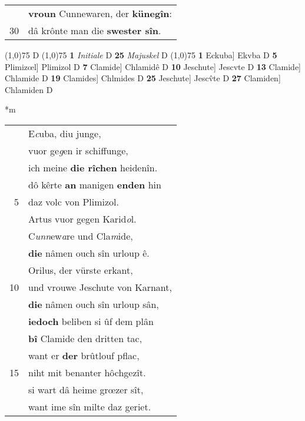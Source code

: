 \documentclass[8pt,a4paper,notitlepage]{article}
\begin{document}
\begin{table}[ht]
\begin{minipage}[t]{0.5\linewidth}
\begin{tabular}{rl}
 & \textbf{vroun} Cunnewaren, der \textbf{künegîn}:\\ 
30 & dâ krônte man die \textbf{swester sîn}.\\ 
\end{tabular}
\scriptsize
\line(1,0){75} \newline
D \newline
\line(1,0){75} \newline
\textbf{1} \textit{Initiale} D  \textbf{25} \textit{Majuskel} D  \newline
\line(1,0){75} \newline
\textbf{1} Eckuba] Ekvba D \textbf{5} Plimizœl] Plimizol D \textbf{7} Clamide] Chlamidê D \textbf{10} Jeschute] Jescvte D \textbf{13} Clamide] Chlamide D \textbf{19} Clamides] Chlmides D \textbf{25} Jeschute] Jescv̂te D \textbf{27} Clamiden] Chlamiden D \newline
\end{minipage}
\hspace{0.5cm}
\begin{minipage}[t]{0.5\linewidth}
\small
\begin{center}*m
\end{center}
\begin{tabular}{rl}
 & E\textit{c}uba, diu junge,\\ 
 & vuor ge\textit{g}en ir schiffunge,\\ 
 & ich meine \textbf{die rîchen} heidenîn.\\ 
 & dô kêrte \textbf{an} manigen \textbf{enden} hin\\ 
5 & daz volc von Plimizol.\\ 
 & Artus vuor gegen Karid\textit{o}l.\\ 
 & C\textit{unn}ew\textit{a}re und Cla\textit{m}ide,\\ 
 & \textbf{die} nâmen ouch sîn urloup ê.\\ 
 & Orilus, der vürste erkant,\\ 
10 & und vrouwe Jeschute von Karnant,\\ 
 & \textbf{die} nâmen ouch sîn urloup sân,\\ 
 & \textbf{iedoch} beliben si ûf dem plân\\ 
 & \textbf{bî} Clamide den dritten tac,\\ 
 & want er \textbf{der} brûtlouf pflac,\\ 
15 & niht mit benanter hôchgezît.\\ 
 & si wart dâ heime grœzer sît,\\ 
 & want ime sîn milte daz geriet.\\ 

\end{tabular}
\end{minipage}
\end{table}
\end{document}
